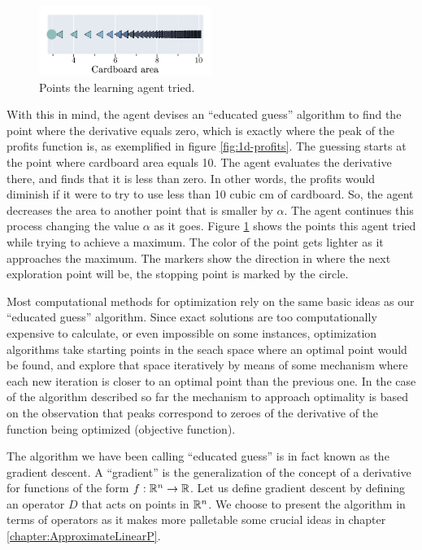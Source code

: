 \begin{figure}
   \centering
   \includegraphics[width=0.5\textwidth]{img/gd-points.pdf} 
   \caption{Points the learning agent tried.}
   \label{fig:gd-points}
\end{figure}

With this in mind, the agent devises an ``educated guess'' algorithm to find the
point where the derivative equals zero, which is exactly where the peak of the
profits function is, as exemplified in figure \ref{fig:1d-profits}. The guessing
starts at the point where cardboard area equals 10. The agent evaluates the
derivative there, and finds that it is less than zero. In other words, the
profits would diminish if it were to try to use less than 10 cubic cm of
cardboard. So, the agent decreases the area to another point that is smaller by
$\alpha$. The agent continues this process changing the value $\alpha$ as it
goes. Figure \ref{fig:gd-points} shows the points this agent tried while trying
to achieve a maximum. The color of the point gets lighter as it approaches the
maximum. The markers show the direction in where the next exploration point will
be, the stopping point is marked by the circle.

Most computational methods for optimization rely on the same basic ideas as our
``educated guess'' algorithm. Since exact solutions are too computationally
expensive to calculate, or even impossible on some instances, optimization
algorithms take starting points in the seach space where an optimal point would
be found, and explore that space iteratively by means of some mechanism where
each new iteration is closer to an optimal point than the previous one. In the
case of the algorithm described so far the mechanism to approach optimality is
based on the observation that peaks correspond to zeroes of the derivative of
the function being optimized (objective function).

The algorithm we have been calling ``educated guess'' is in fact known as the
gradient descent. A ``gradient'' is the generalization of the concept of a
derivative for functions of the form $f: \mathbb{R}^{n} \to \mathbb{R}$. Let us define gradient
descent by defining an operator $D$ that acts on points in $\mathbb{R}^{n}$. We choose
to present the algorithm in terms of operators as it makes more palletable some
crucial ideas in chapter \ref{chapter:ApproximateLinearP}.

